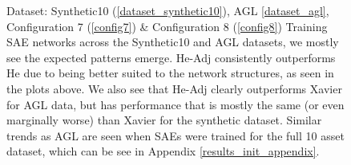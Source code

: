 \documentclass[a4paper,11pt,oneside]{article}
\theoremstyle{plain}
\theoremstyle{definition}
\begin{document}
\begin{figure}[H]
\begin{subfigure}{.5\textwidth}
			\label{figure-agl_mse_init}
		\end{subfigure}
		\caption[SAE MSE by Weight Initialization]
		{Dataset: Synthetic10 (\ref{dataset_synthetic10}), AGL \ref{dataset_agl}, Configuration 7 (\ref{config7}) \& Configuration 8 (\ref{config8})
			\newline Training SAE networks across the Synthetic10 and AGL  datasets, we mostly see the expected patterns emerge. He-Adj consistently outperforms He due to being better suited to the network structures, as seen in the plots above. We also see that He-Adj clearly outperforms Xavier for AGL data, but has performance that is mostly the same (or even marginally worse) than Xavier for the synthetic dataset. Similar trends as AGL are seen when SAEs were trained for the full 10 asset dataset, which can be see in Appendix \ref{results_init_appendix}.}
		\label{figure-mse_init}
	\end{figure}
	
\end{document}
